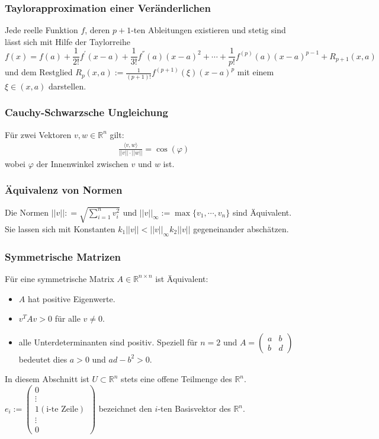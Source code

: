 \subsubsection*{Taylorapproximation einer Veränderlichen} 

Jede  reelle Funktion $f$, deren $p+1$-ten Ableitungen existieren und stetig sind lässt sich mit Hilfe der Taylorreihe  $$f(x) = f(a) + \frac{1}{2!} f^{'} (x-a) +   \frac{1}{3!} f^{''}(a) (x-a)^2 + \cdots  +  \frac{1}{p!} f^{(p)}(a) (x-a)^{p-1} +  R_{p+1}(x,a) $$
und dem Restglied  $R_p(x,a) :=   \frac{1}{(p+1)!} f^{(p+1)}(\xi) (x-a)^{p} $ mit einem $\xi \in (x,a)$ darstellen.


\subsubsection*{Cauchy-Schwarzsche Ungleichung}
 Für zwei Vektoren $v,w \in \mathbb{R}^n$ gilt: 
\begin{align*}
\frac{\langle v, w \rangle}{||v|| \cdot ||w||} = \cos(\varphi) 
\end{align*}
wobei $\varphi$ der Innenwinkel zwischen $v$ und $w$ ist.

\subsubsection*{Äquivalenz von Normen}
 Die Normen $||v||: = \sqrt{\sum_{i = 1}^n v_i^2}$ und $||v||_{\infty}:= \max \{ v_1, \cdots, v_n \} $ sind Äquivalent. Sie lassen sich  mit Konstanten $k_1 ||v|| < ||v||_{\infty} k_2  ||v|| $ gegeneinander abschätzen.

\subsubsection*{Symmetrische Matrizen}
 Für eine symmetrische Matrix $A \in \mathbb{R}^{n \times n}$ ist Äquivalent:
\begin{itemize}
\item $A$ hat positive Eigenwerte.
\item $v^TA v > 0$ für alle $v \neq 0$.
\item alle Unterdeterminanten sind positiv. Speziell für $n=2$ und $A = \begin{pmatrix} a & b \\ b & d\end{pmatrix}$ bedeutet dies
$a >0$ und $ad -b^2 >0$. 
\end{itemize}

\begin{Definition}[Konventionen]
In diesem Abschnitt ist $U \subset \mathbb{R}^n$ stets eine offene Teilmenge des $\mathbb{R}^n$.
 $e_i := \begin{pmatrix}  0 \\  \vdots \\ 1  (\text{i-te Zeile})\\ \vdots \\ 0 \end{pmatrix}$  bezeichnet den $i$-ten Basisvektor des $\mathbb{R}^n$.

\end{Definition}

